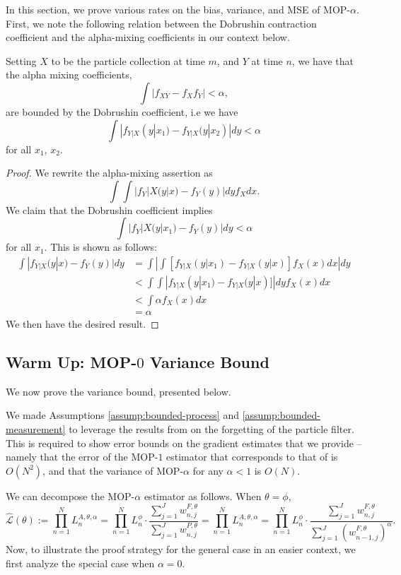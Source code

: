 

In this section, we prove various rates on the bias, variance, and MSE of MOP-$\alpha$. 
First, we note the following relation between the Dobrushin contraction coefficient and the alpha-mixing coefficients in our context below.
\begin{lem}
    \label{lem:dobrushin-implies-alpha-mixing}
    Setting $X$ to be the particle collection at time $m$, and $Y$ at time $n$, we have that the alpha mixing coefficients,
    $$\int | f_{XY} - f_X f_Y | < \alpha,$$
    are bounded by the Dobrushin coefficient, i.e we have
    $$\int | f_{Y|X}(y|x_1) - f_{Y|X}(y|x_2) |dy < \alpha$$ for all $x_1$, $x_2$.
\end{lem}

\begin{proof}
    We rewrite the alpha-mixing assertion as 
    $$\int { \int |f_Y|X(y|x) - f_Y(y)| dy } f_X dx.$$
    We claim that the Dobrushin coefficient implies $$\int | f_Y|X(y|x_1) - f_Y(y) |dy < \alpha$$ for all $x_1$. This is shown as follows:
    \begin{align*}
        \int | f_{Y|X}(y|x) - f_Y(y) |dy 
        &= \int \left|  \int [f_{Y|X}(y|x_1) - f_{Y|X}(y|x)] f_X(x)dx \right|dy \\
        &< \int   \int  | f_{Y|X}(y|x_1) - f_{Y|X}(y|x)] | dy f_X(x)dx \\
        &< \int \alpha f_X(x)dx \\
        &=\alpha
    \end{align*}
    We then have the desired result.
\end{proof}

\subsection{Warm Up: MOP-$0$ Variance Bound}
We now prove the variance bound, presented below. 
\begin{thm}
    
\end{thm}
We made Assumptions \ref{assump:bounded-process} and \ref{assump:bounded-measurement} to leverage the results from \cite{karjalainen23} on the forgetting of the particle filter. This is required to show error bounds on the gradient estimates that we provide -- namely that the error of the MOP-$1$ estimator that corresponds to that of \cite{poyiadjis11} is $O(N^2)$, and that the variance of MOP-$\alpha$ for any $\alpha<1$ is $O(N)$. 

We can decompose the MOP-$\alpha$ estimator as follows. When $\theta=\phi$,
$$\hat{\mathcal{L}}(\theta):=\prod_{n=1}^N L_n^{A, \theta, \alpha}=\prod_{n=1}^N L_n^\phi \cdot \frac{\sum_{j=1}^J w_{n, j}^{F, \theta}}{\sum_{j=1}^J w_{n, j}^{P, \theta}}=\prod_{n=1}^N L_n^{A, \theta, \alpha}=\prod_{n=1}^N L_n^\phi \cdot \frac{\sum_{j=1}^J w_{n, j}^{F, \theta}}{\sum_{j=1}^J (w_{n-1, j}^{F, \theta})^\alpha}.$$
Now, to illustrate the proof strategy for the general case in an easier context, we first analyze the special case when $\alpha=0.$ 

